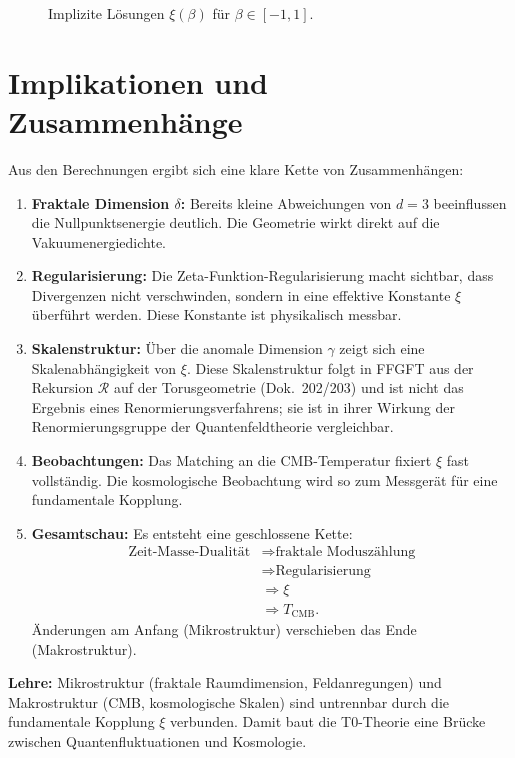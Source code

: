 	\begin{figure}[htbp]
		\centering

		\caption{Implizite Lösungen $\xi(\beta)$ für $\beta\in[-1,1]$.}
		\label{fig:xi_vs_beta}
	\end{figure}
	
	\section{Implikationen und Zusammenhänge}
	\label{sec:discussion}
	
	Aus den Berechnungen ergibt sich eine klare Kette von Zusammenhängen:
	
	\begin{enumerate}
		\item \textbf{Fraktale Dimension $\delta$:} Bereits kleine Abweichungen von $d=3$ beeinflussen die Nullpunktsenergie deutlich. Die Geometrie wirkt direkt auf die Vakuumenergiedichte.
		\item \textbf{Regularisierung:} Die Zeta-Funktion-Regularisierung macht sichtbar, dass Divergenzen nicht verschwinden, sondern in eine effektive Konstante $\xi$ überführt werden. Diese Konstante ist physikalisch messbar.
		\item \textbf{Skalenstruktur:} Über die anomale Dimension $\gamma$ zeigt sich eine Skalenabhängigkeit von $\xi$. Diese Skalenstruktur folgt in FFGFT aus der Rekursion $\mathcal{R}$ auf der Torusgeometrie (Dok.~202/203) und ist nicht das Ergebnis eines Renormierungsverfahrens; sie ist in ihrer Wirkung der Renormierungsgruppe der Quantenfeldtheorie vergleichbar.
		\item \textbf{Beobachtungen:} Das Matching an die CMB-Temperatur fixiert $\xi$ fast vollständig. Die kosmologische Beobachtung wird so zum Messgerät für eine fundamentale Kopplung.
		\item \textbf{Gesamtschau:} Es entsteht eine geschlossene Kette:
	\[
	\begin{aligned}
		\text{Zeit-Masse-Dualität} &\Rightarrow \text{fraktale Moduszählung} \\
		&\Rightarrow \text{Regularisierung} \\
		&\Rightarrow \xi \\
		&\Rightarrow T_{\mathrm{CMB}}.
	\end{aligned}
	\]
		Änderungen am Anfang (Mikrostruktur) verschieben das Ende (Makrostruktur).
	\end{enumerate}
	
	\textbf{Lehre:} Mikrostruktur (fraktale Raumdimension, Feldanregungen) und Makrostruktur (CMB, kosmologische Skalen) sind untrennbar durch die fundamentale Kopplung $\xi$ verbunden. Damit baut die T0-Theorie eine Brücke zwischen Quantenfluktuationen und Kosmologie.
	
